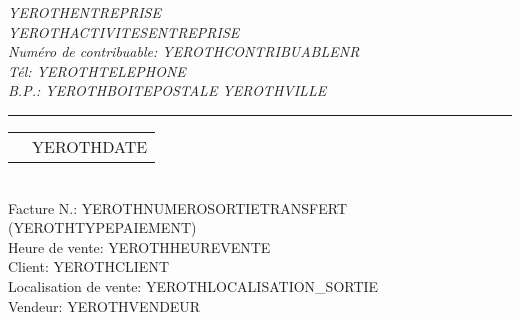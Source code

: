 \documentclass[1.75pt]{article} %
\makeatletter
\newcommand{\headerrow}[2]
{\begin{tabular*}{\linewidth}{l@{\extracolsep{\fill}}r}
	#1 &
	#2 \\
\end{tabular*}}
\makeatother
\begin{document}
\emph{YEROTHENTREPRISE} \\
\emph{YEROTHACTIVITESENTREPRISE} \\
\emph{Num\'ero de contribuable: YEROTHCONTRIBUABLENR} \\
\emph{T\'el: YEROTHTELEPHONE} \\
\emph{B.P.: YEROTHBOITEPOSTALE YEROTHVILLE}

\vspace*{0.2cm}

\hrule

\headerrow
{}
{YEROTHDATE}\\

Facture N.: YEROTHNUMEROSORTIETRANSFERT (YEROTHTYPEPAIEMENT)\\
Heure de vente: YEROTHHEUREVENTE\\
Client: YEROTHCLIENT\\
Localisation de vente: YEROTHLOCALISATION_SORTIE\\
Vendeur: YEROTHVENDEUR
\vspace*{0.2cm}

\end{document}
